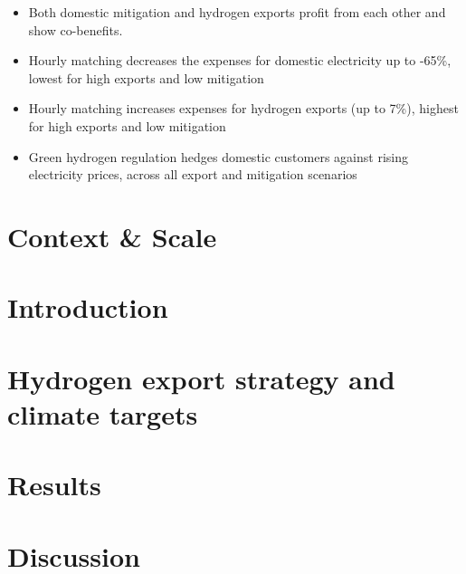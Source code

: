 \documentclass[5p]{elsarticle}
\begin{document}
\begin{itemize}
	\item Both domestic mitigation and hydrogen exports profit from each other and show co-benefits.
	\item Hourly matching decreases the expenses for domestic electricity up to -65\%, lowest for high exports and low mitigation 
	\item Hourly matching increases expenses for hydrogen exports (up to 7\%), highest for high exports and low mitigation 
	\item Green hydrogen regulation hedges domestic customers against rising electricity prices, across all export and mitigation scenarios
\end{itemize}



\section*{Context \& Scale}





\section{Introduction}
\label{sec:intro}



\section{Hydrogen export strategy and climate targets}
\label{sec:policyandtargets}





\section{Results}
\label{sec:results}



\section{Discussion}
\label{sec:discussion}
\end{document}
